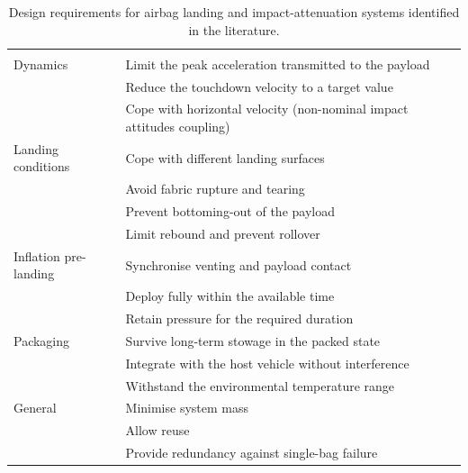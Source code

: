 {\longtablesetup
\begin{longtable}{G{0.19} L{0.51} L{0.30}}
\caption{Design requirements for airbag landing and impact-attenuation systems identified in the literature.}
\label{tab:requirements}\\
\headrow{} &  &  \\
\endfirsthead
\headrow{} &  &  \\
\endhead
{}
\endfoot
\lastrule
\endlastfoot

Dynamics
& Limit the peak acceleration transmitted to the payload & \cite{HolnickiSzulc2023,GardinierTaylor1999,Lim2015,DoDeWeck2012,Alekseychuk2024} \\
& Reduce the touchdown velocity to a target value & \cite{HolnickiSzulc2023} \\
& Cope with horizontal velocity (non-nominal impact attitudes coupling) & \cite{Smith2007,DoDeWeck2012,McCullough1964} \\
\grouprule
Landing conditions
& Cope with different landing surfaces & \cite{McCullough1964,Shen2025,Tutt2008} \\
& Avoid fabric rupture and tearing & \cite{DoDeWeck2012,Cadogan2002} \\
& Prevent bottoming-out of the payload & \cite{GardinierTaylor1999,DoDeWeck2012,Tutt2008,Zhou2019} \\
& Limit rebound and prevent rollover & \cite{WarrickLee2001,GardinierTaylor1999} \\
\grouprule
Inflation pre-landing
& Synchronise venting and payload contact & \cite{CasidayFrey2000} \\
& Deploy fully within the available time & \cite{HolnickiSzulc2023,GardinierTaylor1999} \\
& Retain pressure for the required duration & \cite{GardinierTaylor1999,Cadogan2002} \\
\grouprule
Packaging
& Survive long-term stowage in the packed state & \cite{Cadogan2002} \\
& Integrate with the host vehicle without interference & \cite{HolnickiSzulc2023} \\
& Withstand the environmental temperature range & \cite{Cadogan2002,McCullough1964} \\
\grouprule
General
& Minimise system mass & \cite{HolnickiSzulc2023,GardinierTaylor1999,Cadogan2002} \\
& Allow reuse & \cite{GardinierTaylor1999,McCullough1964} \\
& Provide redundancy against single-bag failure & \cite{Smith2007} \\
\end{longtable}
}


